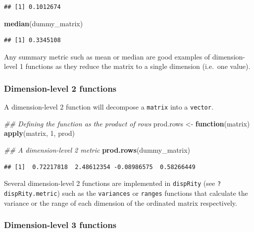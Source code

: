 \documentclass[
]{book}
\newenvironment{Shaded}{\begin{snugshade}}{\end{snugshade}}
\newcommand{\CommentTok}[1]{\textcolor[rgb]{0.56,0.35,0.01}{\textit{#1}}}
\newcommand{\ControlFlowTok}[1]{\textcolor[rgb]{0.13,0.29,0.53}{\textbf{#1}}}
\newcommand{\DecValTok}[1]{\textcolor[rgb]{0.00,0.00,0.81}{#1}}
\newcommand{\KeywordTok}[1]{\textcolor[rgb]{0.13,0.29,0.53}{\textbf{#1}}}
\newcommand{\NormalTok}[1]{#1}
\newcommand{\StringTok}[1]{\textcolor[rgb]{0.31,0.60,0.02}{#1}}
\begin{document}
\begin{verbatim}
## [1] 0.1012674
\end{verbatim}

\begin{Shaded}
\begin{Highlighting}[]
\KeywordTok{median}\NormalTok{(dummy\_matrix)}
\end{Highlighting}
\end{Shaded}

\begin{verbatim}
## [1] 0.3345108
\end{verbatim}

Any summary metric such as mean or median are good examples of dimension-level 1 functions as they reduce the matrix to a single dimension (i.e.~one value).

\hypertarget{dimension-level-2-functions}{%
\subsubsection{Dimension-level 2 functions}\label{dimension-level-2-functions}}

A dimension-level 2 function will decompose a \texttt{matrix} into a \texttt{vector}.

\begin{Shaded}
\begin{Highlighting}[]
\CommentTok{\#\# Defining the function as the product of rows}
\NormalTok{prod.rows \textless{}{-}}\StringTok{ }\ControlFlowTok{function}\NormalTok{(matrix) }\KeywordTok{apply}\NormalTok{(matrix, }\DecValTok{1}\NormalTok{, prod)}

\CommentTok{\#\# A dimension{-}level 2 metric}
\KeywordTok{prod.rows}\NormalTok{(dummy\_matrix)}
\end{Highlighting}
\end{Shaded}

\begin{verbatim}
## [1]  0.72217818  2.48612354 -0.08986575  0.58266449
\end{verbatim}

Several dimension-level 2 functions are implemented in \texttt{dispRity} (see \texttt{?dispRity.metric}) such as the \texttt{variances} or \texttt{ranges} functions that calculate the variance or the range of each dimension of the ordinated matrix respectively.

\hypertarget{dimension-level-3-functions}{%
\subsubsection{Dimension-level 3 functions}\label{dimension-level-3-functions}}
\end{document}
